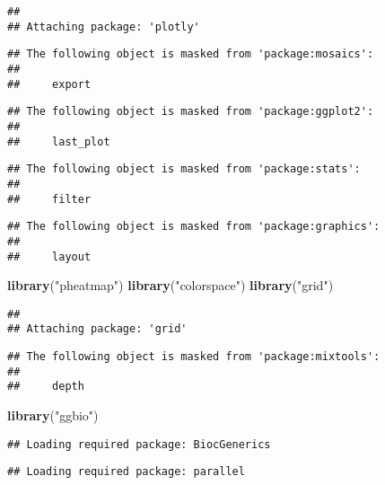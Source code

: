 \documentclass[]{article}
\newenvironment{Shaded}{\begin{snugshade}}{\end{snugshade}}
\newcommand{\KeywordTok}[1]{\textcolor[rgb]{0.13,0.29,0.53}{\textbf{#1}}}
\newcommand{\NormalTok}[1]{#1}
\newcommand{\StringTok}[1]{\textcolor[rgb]{0.31,0.60,0.02}{#1}}
\begin{document}
\begin{verbatim}
## 
## Attaching package: 'plotly'
\end{verbatim}

\begin{verbatim}
## The following object is masked from 'package:mosaics':
## 
##     export
\end{verbatim}

\begin{verbatim}
## The following object is masked from 'package:ggplot2':
## 
##     last_plot
\end{verbatim}

\begin{verbatim}
## The following object is masked from 'package:stats':
## 
##     filter
\end{verbatim}

\begin{verbatim}
## The following object is masked from 'package:graphics':
## 
##     layout
\end{verbatim}

\begin{Shaded}
\begin{Highlighting}[]
\KeywordTok{library}\NormalTok{(}\StringTok{"pheatmap"}\NormalTok{)  }
\KeywordTok{library}\NormalTok{(}\StringTok{"colorspace"}\NormalTok{)  }
\KeywordTok{library}\NormalTok{(}\StringTok{"grid"}\NormalTok{)  }
\end{Highlighting}
\end{Shaded}

\begin{verbatim}
## 
## Attaching package: 'grid'
\end{verbatim}

\begin{verbatim}
## The following object is masked from 'package:mixtools':
## 
##     depth
\end{verbatim}

\begin{Shaded}
\begin{Highlighting}[]
\KeywordTok{library}\NormalTok{(}\StringTok{"ggbio"}\NormalTok{) }
\end{Highlighting}
\end{Shaded}

\begin{verbatim}
## Loading required package: BiocGenerics
\end{verbatim}

\begin{verbatim}
## Loading required package: parallel
\end{verbatim}
\end{document}
